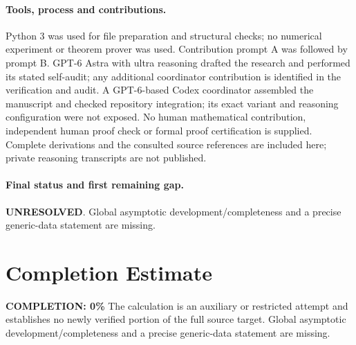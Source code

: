 \documentclass[11pt]{article}
\begin{document}
\paragraph{Tools, process and contributions.}
Python 3 was used for file preparation and structural checks; no numerical experiment or theorem prover was used. Contribution prompt A was followed by prompt B. GPT-6 Astra with ultra reasoning drafted the research and performed its stated self-audit; any additional coordinator contribution is identified in the verification and audit. A GPT-6-based Codex coordinator assembled the manuscript and checked repository integration; its exact variant and reasoning configuration were not exposed. No human mathematical contribution, independent human proof check or formal proof certification is supplied. Complete derivations and the consulted source references are included here; private reasoning transcripts are not published.

\paragraph{Final status and first remaining gap.}
\textbf{UNRESOLVED}. Global asymptotic development/completeness and a precise generic-data statement are missing.

\section{Completion Estimate}
\noindent\textbf{COMPLETION: 0\%}
The calculation is an auxiliary or restricted attempt and establishes no newly verified portion of the full source target. Global asymptotic development/completeness and a precise generic-data statement are missing.
\end{document}
